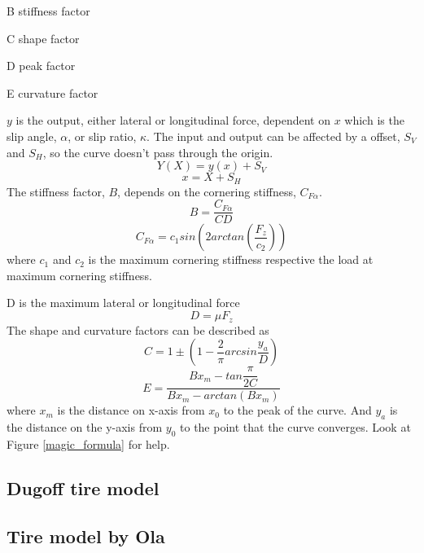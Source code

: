B stiffness factor

C shape factor

D peak factor

E curvature factor

$ y $ is the output, either lateral or longitudinal force, dependent on $ x $ which is the slip angle, $ \alpha $, or slip ratio, $ \kappa $. The input and output can be affected by a offset, $ S_{V} $ and $ S_{H} $, so the curve doesn't pass through the origin.
\begin{equation}
	Y(X) = y(x) + S_{V}
\end{equation}
\begin{equation}
	x = X + S_{H}
\end{equation}
The stiffness factor, $ B $, depends on the cornering stiffness, $ C_{F\alpha} $.
\begin{equation}
	B = \dfrac{C_{F\alpha}}{CD}
\end{equation}
\begin{equation}
	C_{F\alpha} = c_{1}sin(2arctan(\dfrac{F_{z}}{c_{2}}))
\end{equation}
where $ c_{1} $ and $ c_{2} $ is the maximum cornering stiffness respective the load at maximum cornering stiffness.

D is the maximum lateral or longitudinal force
\begin{equation}
	D = \mu F_{z}
\end{equation}
The shape and curvature factors can be described as
\begin{equation}
	C = 1 \pm (1 - \dfrac{2}{\pi}arcsin\dfrac{y_{a}}{D})
\end{equation}
\begin{equation}
	E = \dfrac{Bx_{m} - tan{\dfrac{\pi}{2C}}}{Bx_{m} - arctan(Bx_{m})}
\end{equation}
where $ x_{m} $ is the distance on x-axis from $ x_{0} $ to the peak of the curve. And $ y_{a} $ is the distance on the y-axis from $ y_{0} $ to the point that the curve converges. Look at Figure \ref{magic_formula} for help.

\subsection{Dugoff tire model}

\subsection{Tire model by Ola}

